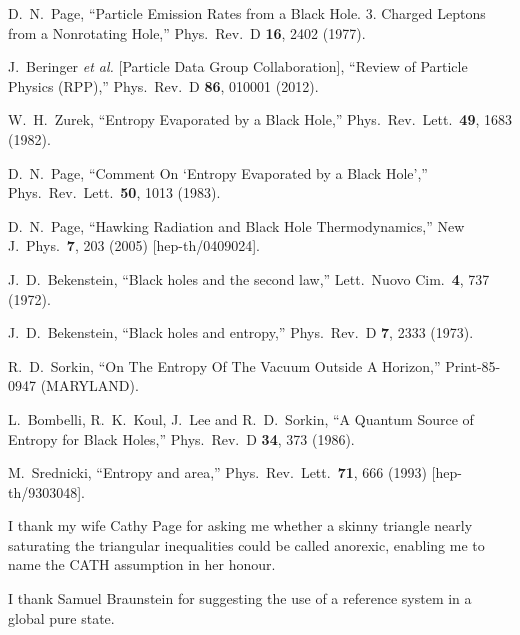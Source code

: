 \documentclass[12pt]{article}
\begin{document}
\begin{thebibliography}{99}
  D.~N.~Page,
  ``Particle Emission Rates from a Black Hole. 3. Charged Leptons from a Nonrotating Hole,''
  Phys.\ Rev.\ D {\bf 16}, 2402 (1977).

  J.~Beringer {\it et al.}  [Particle Data Group Collaboration],
  ``Review of Particle Physics (RPP),''
  Phys.\ Rev.\ D {\bf 86}, 010001 (2012).
  
  W.~H.~Zurek,
  ``Entropy Evaporated by a Black Hole,''
  Phys.\ Rev.\ Lett.\  {\bf 49}, 1683 (1982).

  D.~N.~Page,
  ``Comment On `Entropy Evaporated by a Black Hole',''
  Phys.\ Rev.\ Lett.\  {\bf 50}, 1013 (1983).

D.~N.~Page,
  ``Hawking Radiation and Black Hole Thermodynamics,''
  New J.\ Phys.\  {\bf 7}, 203 (2005)
  [hep-th/0409024].

  J.~D.~Bekenstein,
  ``Black holes and the second law,''
  Lett.\ Nuovo Cim.\  {\bf 4}, 737 (1972).

  J.~D.~Bekenstein,
  ``Black holes and entropy,''
  Phys.\ Rev.\ D {\bf 7}, 2333 (1973).
  
  R.~D.~Sorkin,
  ``On The Entropy Of The Vacuum Outside A Horizon,''
  Print-85-0947 (MARYLAND).
  
  L.~Bombelli, R.~K.~Koul, J.~Lee and R.~D.~Sorkin,
  ``A Quantum Source of Entropy for Black Holes,''
  Phys.\ Rev.\ D {\bf 34}, 373 (1986).
  
  M.~Srednicki,
  ``Entropy and area,''
  Phys.\ Rev.\ Lett.\  {\bf 71}, 666 (1993)
  [hep-th/9303048].  
  
  I thank my wife Cathy Page for asking me whether a skinny triangle nearly saturating the triangular inequalities could be called anorexic, enabling me to name the CATH assumption in her honour.
  
  I thank Samuel Braunstein for suggesting the use of a reference system in a global pure state.

\end{thebibliography}
\end{document}
